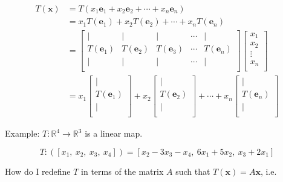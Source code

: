 \documentclass[12pt]{article}
\theoremstyle{plain}
\theoremstyle{remark}
\theoremstyle{definition}
\begin{document}
\begin{align*}
T\left( \mathbf{x} \right) &= T\left( x_{1}{\mathbf{e}}_{1} + x_{2}{\mathbf{e}}_{2} + \cdots + x_{n}{\mathbf{e}}_{n} \right) \\
&= x_{1}T\left( {\mathbf{e}}_{1} \right) + x_{2}T\left( {\mathbf{e}}_{2} \right) + \cdots + x_{n}T\left( {\mathbf{e}}_{n} \right) \\
&= \begin{bmatrix} \mid & \mid & \mid & \cdots & \mid \\T\left( {\mathbf{e}}_{1} \right) & T\left( {\mathbf{e}}_{2} \right) & T\left( {\mathbf{e}}_{3} \right) & \cdots & T\left( {\mathbf{e}}_{n} \right) \\ \mid & \mid & \mid & \cdots & \mid \\\end{bmatrix}\begin{bmatrix}x_{1} \\x_{2} \\ \vdots \\x_{n} \\\end{bmatrix} \\
&= x_{1}\begin{bmatrix} \mid \\T\left( {\mathbf{e}}_{1} \right) \\ \mid \\\end{bmatrix} + x_{2}\begin{bmatrix} \mid \\T\left( {\mathbf{e}}_{2} \right) \\ \mid \\\end{bmatrix} + \cdots + x_{n}\begin{bmatrix} \mid \\T\left( {\mathbf{e}}_{n} \right) \\ \mid \\\end{bmatrix}
\end{align*}


Example: \(T:\mathbb{R}^{4} \rightarrow \mathbb{R}^{3}\) is a linear
map.

\[{T:\left( \left\lbrack x_{1},\ x_{2},\ x_{3},\ x_{4} \right\rbrack \right) }{= \left\lbrack x_{2} - 3x_{3} - x_{4},\ 6x_{1} + 5x_{2},\ x_{3} + 2x_{1} \right\rbrack} \]

How do I redefine \(T\) in terms of the matrix \(A\) such that
\(T\left( \mathbf{x} \right) = A\mathbf{x}\), i.e.
\end{document}
